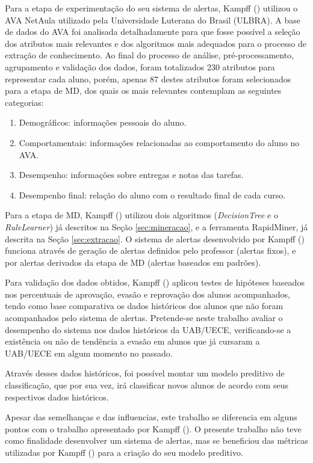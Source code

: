 Para a etapa de experimentação do seu sistema de alertas, Kampff (\citeyear{kampff2009mineraccao}) utilizou o AVA NetAula utilizado pela Universidade Luterana do Brasil (ULBRA). A base de dados do AVA foi analisada detalhadamente para que fosse possível a seleção dos atributos mais relevantes e dos algoritmos mais adequados para o processo de extração de conhecimento. Ao final do processo de análise, pré-processamento, agrupamento e validação dos dados, foram totalizados 230 atributos para representar cada aluno, porém, apenas 87 destes atributos foram selecionados para a etapa de MD, dos quais os mais relevantes contemplam as seguintes categorias:

\begin{enumerate}
\item Demográficos: informações pessoais do aluno.
\item Comportamentais: informações relacionadas ao comportamento do aluno no AVA.
\item Desempenho: informações sobre entregas e notas das tarefas.
\item Desempenho final: relação do aluno com o resultado final de cada curso.
\end{enumerate}

Para a etapa de MD, Kampff (\citeyear{kampff2009mineraccao}) utilizou dois algoritmos (\textit{DecisionTree} e o \textit{RuleLearner}) já descritos na Seção \ref{sec:mineracao}, e a ferramenta RapidMiner, já descrita na Seção \ref{sec:extracao}.
O sistema de alertas desenvolvido por Kampff (\citeyear{kampff2009mineraccao}) funciona através de geração de alertas definidos pelo professor (alertas fixos), e por alertas derivados da etapa de MD (alertas baseados em padrões).

Para validação dos dados obtidos, Kampff (\citeyear{kampff2009mineraccao}) aplicou testes de hipóteses baseados nos percentuais de aprovação, evasão e reprovação dos alunos acompanhados, tendo como base comparativa os dados históricos dos alunos que não foram acompanhados pelo sistema de alertas. Pretende-se neste trabalho avaliar o desempenho do sistema nos dados históricos da UAB/UECE, verificando-se a existência ou não de tendência a evasão em alunos que já cursaram a UAB/UECE em algum momento no passado.

Através desses dados históricos, foi possível montar um modelo preditivo de classificação, que por sua vez, irá classificar novos alunos de acordo com seus respectivos dados históricos.

Apesar das semelhanças e das influencias, este trabalho se diferencia em alguns pontos com o trabalho apresentado por Kampff (\citeyear{kampff2009mineraccao}). O presente trabalho não teve como finalidade desenvolver um sistema de alertas, mas se beneficiou das métricas utilizadas por Kampff (\citeyear{kampff2009mineraccao}) para a criação do seu modelo preditivo.

